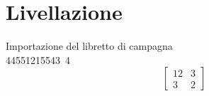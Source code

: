 \chapter{Livellazione}
\label{cap:cap2}
Importazione del libretto di campagna\\
\si{44551215543.4}{\meter\squared}
\begin{equation}
\begin{bmatrix}
12 & 3 \\ 
3 & 2
\end{bmatrix}
\end{equation}
